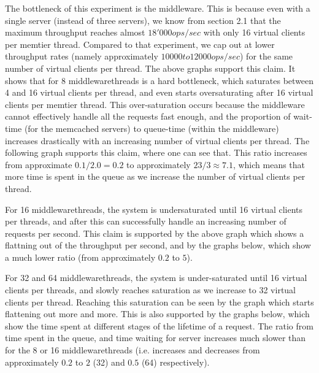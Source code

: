 \documentclass[11pt,a4paper]{article}
\begin{document}
The bottleneck of this experiment is the middleware.
This is because even with a single server (instead of three servers), we know from section 2.1 that the maximum throughput reaches almost $18'000 ops/sec$ with only 16 virtual clients per memtier thread.
Compared to that experiment, we cap out at lower throughput rates (namely approximately $10000 to 12000 ops/sec$) for the same number of virtual clients per thread. 
The above graphs support this claim.
It shows that for 8 middlewarethreads is a hard bottleneck, which saturates between 4 and 16 virtual clients per thread, and even starts oversaturating after 16 virtual clients per memtier thread.
This over-saturation occurs because the middleware cannot effectively handle all the requests fast enough, and the proportion of wait-time (for the memcached servers) to queue-time (within the middleware) increases drastically with an increasing number of virtual clients per thread.
The following graph supports this claim, where one can see that.
This ratio increases from approximate $0.1 / 2.0 = 0.2$ to approximately $23 / 3 \approx 7.1 $, which means that more time is spent in the queue as we increase the number of virtual clients per thread.

For 16 middlewarethreads, the system is undersaturated until 16 virtual clients per threads, and after this can successfully handle an increasing number of requests per second.
This claim is supported by the above graph which shows a flattning out of the throughput per second, and by the graphs below, which show a much lower ratio (from approximately $0.2$ to $5$).

For 32 and 64 middlewarethreads, the system is under-saturated until 16 virtual clients per threads, and slowly reaches saturation as we increase to 32 virtual clients per thread.
Reaching this saturation can be seen by the graph which starts flattening out more and more.
This is also supported by the graphs below, which show the time spent at different stages of the lifetime of a request.
The ratio from time spent in the queue, and time waiting for server increases much slower than for the 8 or 16 middlewarethreads (i.e. increases and decreases from approximately $0.2$ to $2$ (32) and $ 0.5$ (64) respectively).
\end{document}
